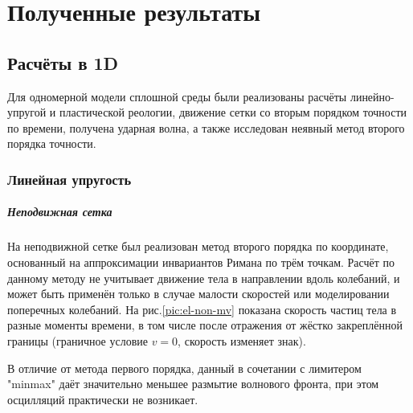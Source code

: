\newpage
\section{Полученные результаты}
\subsection{Расчёты в 1D}
Для одномерной модели сплошной среды были реализованы расчёты линейно-упругой и пластической реологии, движение сетки со вторым порядком точности по времени, получена ударная волна, а также исследован неявный метод второго порядка точности.
\subsubsection{Линейная упругость}
\subparagraph{Неподвижная сетка}
На неподвижной сетке был реализован метод второго порядка по координате, основанный на аппроксимации инвариантов Римана по трём точкам. Расчёт по данному методу не учитывает движение тела в направлении вдоль колебаний, и может быть применён только в случае малости скоростей или моделировании поперечных колебаний. На      
рис.\ref{pic:el-non-mv} показана скорость частиц тела в разные моменты времени, в том числе после отражения от жёстко закреплённой границы (граничное условие $v = 0$, скорость изменяет знак).

В отличие от метода первого порядка, данный в сочетании с лимитером "minmax" даёт значительно меньшее размытие волнового фронта, при этом осцилляций практически не возникает.

